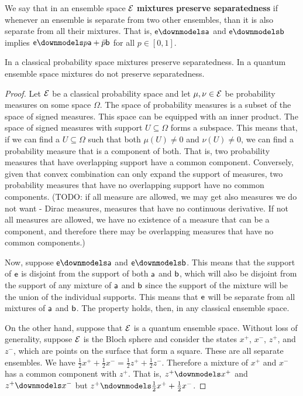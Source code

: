 \begin{defn}
	We say that in an ensemble space $\Ens$ \textbf{mixtures preserve separatedness} if whenever an ensemble is separate from two other ensembles, than it is also separate from all their mixtures. That is, $\ens \separate \ens[a]$ and $\ens \separate \ens[b]$ implies $\ens \separate p \ens[a] + \bar{p} \ens[b]$ for all $p \in [0,1]$.
\end{defn}

\begin{conj}
	In a classical probability space mixtures preserve separatedness. In a quantum ensemble space mixtures do not preserve separatedness.
\end{conj}

\begin{proof}
	Let $\Ens$ be a classical probability space and let $\mu, \nu \in \Ens$ be probability measures on some space $\Omega$. The space of probability measures is a subset of the space of signed measures. This space can be equipped with an inner product. The space of signed measures with support $U \subseteq \Omega$ forms a subspace. This means that, if we can find a $U \subseteq \Omega$ such that both $\mu(U) \neq 0$ and $\nu(U) \neq 0$, we can find a probability measure that is a component of both. That is, two probability measures that have overlapping support have a common component. Conversely, given that convex combination can only expand the support of measures, two probability measures that have no overlapping support have no common components. (TODO: if all measure are allowed, we may get also measures we do not want - Dirac measures, measures that have no continuous derivative. If not all measures are allowed, we have no existence of a measure that can be a component, and therefore there may be overlapping measures that have no common components.)
	
	Now, suppose $\ens \separate \ens[a]$ and $\ens \separate \ens[b]$. This means that the support of $\ens$ is disjoint from the support of both $\ens[a]$ and $\ens[b]$, which will also be disjoint from the support of any mixture of $\ens[a]$ and $\ens[b]$ since the support of the mixture will be the union of the individual supports. This means that $\ens$ will be separate from all mixtures of $\ens[a]$ and $\ens[b]$. The property holds, then, in any classical ensemble space.
	
	On the other hand, suppose that $\Ens$ is a quantum ensemble space. Without loss of generality, suppose $\Ens$ is the Bloch sphere and consider the states $x^+$, $x^-$, $z^+$, and $z^-$, which are points on the surface that form a square. These are all separate ensembles. We have $\frac{1}{2} x^+ + \frac{1}{2} x^- = \frac{1}{2} z^+ + \frac{1}{2} z^-$. Therefore a mixture of $x^+$ and $x^-$ has a common component with $z^+$. That is, $z^+ \separate x^+$ and $z^+ \separate x^-$ but $z^+ \nseparate \frac{1}{2} x^+ + \frac{1}{2} x^-$.
\end{proof}

